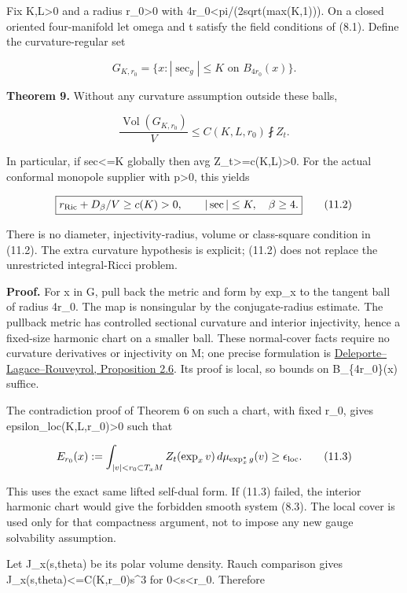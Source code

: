 \documentclass[
  10pt,
]{article}
\begin{document}
Fix K,L\textgreater0 and a radius r\_0\textgreater0 with
4r\_0\textless pi/(2sqrt(max(K,1))). On a closed oriented four-manifold
let omega and t satisfy the field conditions of (8.1). Define the
curvature-regular set

\[
 G_{K,r_0}=\{x: |\sec_g|\le K\text{ on }B_{4r_0}(x)\}.
\]

\textbf{Theorem 9.} Without any curvature assumption outside these
balls,

\[
 \boxed{\frac{\operatorname{Vol}(G_{K,r_0})}{V}
                   \le C(K,L,r_0)\fint Z_t.}           \tag{11.1}
\]

In particular, if \textbar sec\textbar\textless=K globally then avg
Z\_t\textgreater=c(K,L)\textgreater0. For the actual conformal monopole
supplier with p\textgreater0, this yields

\[
 \boxed{r_{\rm Ric}+D_\beta/V\ge c(K)>0,
                 \qquad |\sec|\le K,\quad\beta\ge4.}  \tag{11.2}
\]

There is no diameter, injectivity-radius, volume or class-square
condition in (11.2). The extra curvature hypothesis is explicit; (11.2)
does not replace the unrestricted integral-Ricci problem.

\textbf{Proof.} For x in G, pull back the metric and form by exp\_x to
the tangent ball of radius 4r\_0. The map is nonsingular by the
conjugate-radius estimate. The pullback metric has controlled sectional
curvature and interior injectivity, hence a fixed-size harmonic chart on
a smaller ball. These normal-cover facts require no curvature
derivatives or injectivity on M; one precise formulation is
\href{https://arxiv.org/html/2601.16176v1\#S2.SS3}{Deleporte--Lagace--Rouveyrol,
Proposition 2.6}. Its proof is local, so bounds on B\_\{4r\_0\}(x)
suffice.

The contradiction proof of Theorem 6 on such a chart, with fixed r\_0,
gives epsilon\_loc(K,L,r\_0)\textgreater0 such that

\[
 E_{r_0}(x):=\int_{|v|<r_0\subset T_xM}
                Z_t(\exp_xv)\,d\mu_{\exp_x^*g}(v)
                              \ge\epsilon_{\rm loc}. \tag{11.3}
\]

This uses the exact same lifted self-dual form. If (11.3) failed, the
interior harmonic chart would give the forbidden smooth system (8.3).
The local cover is used only for that compactness argument, not to
impose any new gauge solvability assumption.

Let J\_x(s,theta) be its polar volume density. Rauch comparison gives
J\_x(s,theta)\textless=C(K,r\_0)s\^{}3 for 0\textless s\textless r\_0.
Therefore
\end{document}

